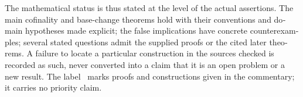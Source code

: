 \begin{otherlanguage}{english}
\begin{otherlanguage}{english}
The mathematical status is thus stated at the level of the actual assertions. The main cofinality and base-change theorems hold with their conventions and domain hypotheses made explicit; the false implications have concrete counterexamples; several stated questions admit the supplied proofs or the cited later theorems. A failure to locate a particular construction in the sources checked is recorded as such, never converted into a claim that it is an open problem or a new result. The label \ours\ marks proofs and constructions given in the commentary; it carries no priority claim.
\end{otherlanguage}
\end{otherlanguage}
\dgrchunkend
